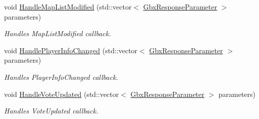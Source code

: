 \begin{DoxyCompactItemize}
void \hyperlink{classCallBackManager_a5f8553720ce21a9d55dd6e5cce21fcc2}{Handle\-Map\-List\-Modified} (std\-::vector$<$ \hyperlink{classGbxResponseParameter}{Gbx\-Response\-Parameter} $>$ parameters)
\begin{DoxyCompactList}\small\item\em Handles Map\-List\-Modified callback. \end{DoxyCompactList}\item 
void \hyperlink{classCallBackManager_a0373533b769d15667a66c1607369cfff}{Handle\-Player\-Info\-Changed} (std\-::vector$<$ \hyperlink{classGbxResponseParameter}{Gbx\-Response\-Parameter} $>$ parameters)
\begin{DoxyCompactList}\small\item\em Handles Player\-Info\-Changed callback. \end{DoxyCompactList}\item 
void \hyperlink{classCallBackManager_a7af7f38c8e0994fcbba2de59dee1921f}{Handle\-Vote\-Updated} (std\-::vector$<$ \hyperlink{classGbxResponseParameter}{Gbx\-Response\-Parameter} $>$ parameters)
\begin{DoxyCompactList}\small\item\em Handles Vote\-Updated callback. \end{DoxyCompactList}\end{DoxyCompactItemize}
